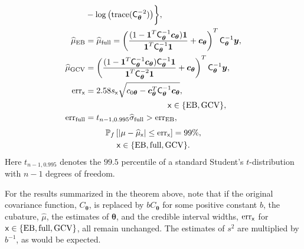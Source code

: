 \documentclass[twocolumn]{svjour3}          %
\newcommand{\bm}[1]{\boldsymbol{#1}}
\newcommand{\trace}[1]{\textup{trace}{#1}}
\newcommand{\vtheta}{{\bm{\theta}}}
\newcommand{\vc}{\bm{c}}
\newcommand{\vy}{\bm{y}}
\newcommand{\vone}{\bm{1}}
\newcommand{\mC}{\mathsf{C}}
\newcommand{\mCInv}{\mathsf{C}^{-1}}
\newcommand{\hmu}{\widehat{\mu}}
\newcommand{\hsigma}{\widehat{\sigma}}
\newcommand{\MLE}{\textup{EB}}
\newcommand{\full}{\textup{full}}
\newcommand{\GCV}{\textup{GCV}}
\newcommand{\err}{\textup{err}}
\begin{document}
\begin{theorem}
\begin{align}
\label{vthetaGCV}
& - \log \left ( \trace(\mC^{-2}_\vtheta) \right ) \biggr\}, \\
\hmu_\MLE  &= \hmu_\full =
\left(
\frac{ (1 - \vone^T  \mCInv_\vtheta\vc_{\vtheta} )  \vone }{ \vone^T \mCInv_\vtheta \vone}   +  \vc_{\vtheta} 
\right)^T  \mCInv_\vtheta \vy, \\
\label{eqn:muCV}
\widehat{\mu}_{\textup{GCV}}
& = \left(\frac{(1 - \vone^T  \mC_\vtheta^{-1}\vc_{\vtheta}) \mC_\vtheta^{-1} \vone}{\vone^T \mC_\vtheta^{-2} \vone} + \vc_{\vtheta} \right)^T \mC_\vtheta^{-1} \vy, \\ 
\nonumber
\err_{\mathsf{x}} & = 2.58 s_{\mathsf{x}} \sqrt{c_{0\vtheta} - \vc_{\vtheta}^T\mC_\vtheta^{-1}\vc_{\vtheta} }, \\
& \hspace{3.5cm} \mathsf{x} \in \{\MLE, \GCV\},  \label{eqn:err_MLEGCV}\\ 
\err_{\textup{full}} 
& = t_{n-1,0.995} \hsigma_{\textup{full}} > \err_\MLE, \label{FJH:eq:errFull}
\end{align}
\begin{multline}
\label{eqn_prob_CI}
\mathbb{P}_f \left[
|\mu-\hmu_{\mathsf{x}}| \leq \err_{\mathsf{x}} \right]  = 99\%, \\ \mathsf{x} \in \{\MLE, \full, \GCV\}.
\end{multline}
Here $t_{n-1,0.995}$ denotes the $99.5$ percentile of a standard Student's $t$-distribution with $n-1$ degrees of freedom.
\end{theorem}

For the results summarized in the theorem above, note that if the original covariance function, $C_\vtheta$, is replaced by $b C_\vtheta$ for some positive constant $b$, the cubature, $\hmu$, the estimates of $\vtheta$, and the credible interval widths, $\err_{\mathsf{x}}$ for $\mathsf{x} \in \{\MLE, \full, \GCV\}$, all remain unchanged.  The estimates of $s^2$ are multiplied by $b^{-1}$, as would be expected. 

\end{document}
